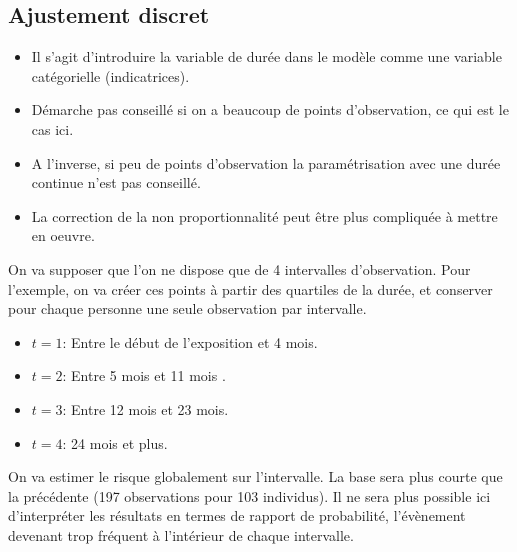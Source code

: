 \documentclass[
  12pt,
  letterpaper,
  DIV=11,
  numbers=noendperiod,
  onepage,
  openany]{scrreprt}
\providecommand{\tightlist}{%
  \setlength{\itemsep}{0pt}\setlength{\parskip}{0pt}}\usepackage{longtable,booktabs,array}
\begin{document}
\hypertarget{ajustement-discret}{%
\subsection{Ajustement discret}\label{ajustement-discret}}

\begin{itemize}
\tightlist
\item
  Il s'agit d'introduire la variable de durée dans le modèle comme une
  variable catégorielle (indicatrices).
\item
  Démarche pas conseillé si on a beaucoup de points d'observation, ce
  qui est le cas ici.
\item
  A l'inverse, si peu de points d'observation la paramétrisation avec
  une durée continue n'est pas conseillé.
\item
  La correction de la non proportionnalité peut être plus compliquée à
  mettre en oeuvre.
\end{itemize}

On va supposer que l'on ne dispose que de 4 intervalles d'observation.
Pour l'exemple, on va créer ces points à partir des quartiles de la
durée, et conserver pour chaque personne une seule observation par
intervalle.

\begin{itemize}
\tightlist
\item
  \(t=1\): Entre le début de l'exposition et 4 mois.
\item
  \(t=2\): Entre 5 mois et 11 mois .
\item
  \(t=3\): Entre 12 mois et 23 mois.
\item
  \(t=4\): 24 mois et plus.
\end{itemize}

On va estimer le risque globalement sur l'intervalle. La base sera plus
courte que la précédente (197 observations pour 103 individus). Il ne
sera plus possible ici d'interpréter les résultats en termes de rapport
de probabilité, l'évènement devenant trop fréquent à l'intérieur de
chaque intervalle.
\end{document}
